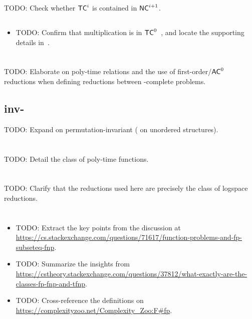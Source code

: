 TODO: Check whether $\mathsf{TC}^{i}$ is contained in $\mathsf{NC}^{i + 1}$.
\subsection{}
\begin{itemize}
\item TODO: Confirm that multiplication is in $\mathsf{TC}^{0}$~\cite{BussLectureNotes}, and locate the supporting details in~\cite{doi:10.1137/0213028}.
\end{itemize}


\section{}
TODO: Elaborate on poly-time relations and the use of first-order/$\mathsf{AC}^{0}$ reductions when defining reductions between -complete problems.

\subsection{inv-}
TODO: Expand on permutation-invariant  ( on unordered structures).

\section{}
TODO: Detail the class of poly-time functions.

\section{}
TODO: Clarify that the reductions used here are precisely the class  of logspace reductions.

\section{}
\begin{itemize}
\item TODO: Extract the key points from the discussion at \url{https://cs.stackexchange.com/questions/71617/function-problems-and-fp-subseteq-fnp}.
\item TODO: Summarize the insights from \url{https://cstheory.stackexchange.com/questions/37812/what-exactly-are-the-classes-fp-fnp-and-tfnp}.
\item TODO: Cross-reference the definitions on \url{https://complexityzoo.net/Complexity_Zoo:F#fp}.
\end{itemize}


